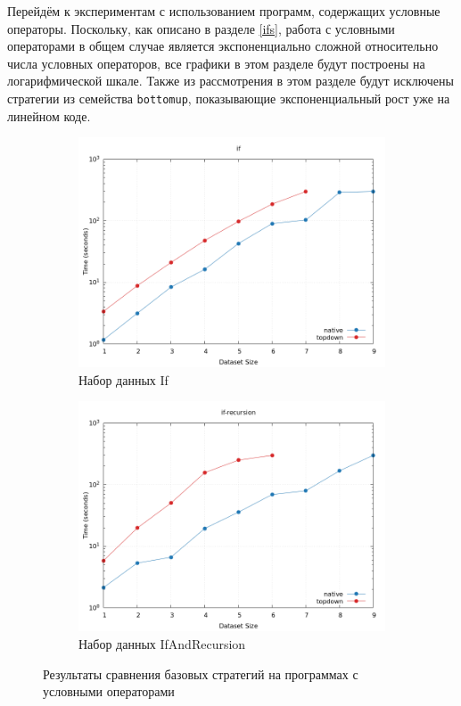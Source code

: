 \documentclass[../thesis.tex]{subfiles}
\begin{document}
Перейдём к экспериментам с использованием программ, содержащих условные операторы. Поскольку, как описано в разделе \ref{ifs}, работа с условными операторами в общем случае является экспоненциально сложной относительно числа условных операторов, все графики в этом разделе будут построены на логарифмической шкале. Также из рассмотрения в этом разделе будут исключены стратегии из семейства \texttt{bottomup}, показывающие экспоненциальный рост уже на линейном коде.

\begin{figure}[h]
    \begin{subfigure}{0.5\textwidth}
    \includegraphics[width=\linewidth]{basic_if.png} 
    \caption{Набор данных If}
    \end{subfigure}
    \begin{subfigure}{0.5\textwidth}
    \includegraphics[width=\linewidth]{basic_ifrec.png}
    \caption{Набор данных IfAndRecursion}
    \end{subfigure}
    \caption{Результаты сравнения базовых стратегий на программах с условными операторами}
    \label{basic_ifs}
\end{figure}
\end{document}
